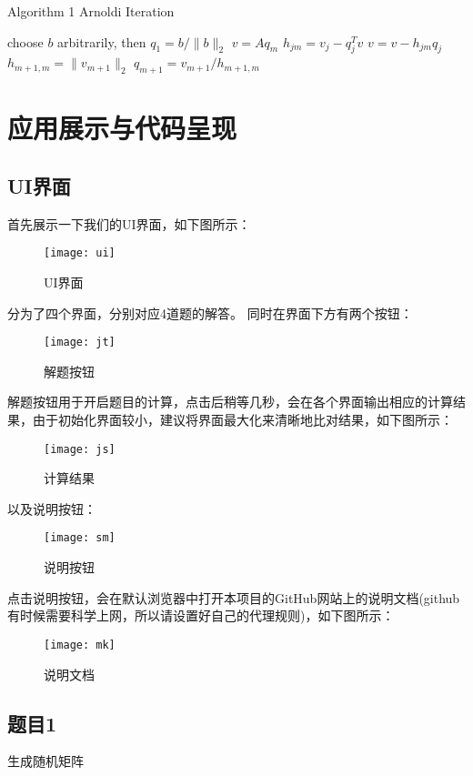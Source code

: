 \documentclass{source/Report}
\begin{document}
\begin{algorithm}
  \caption{Algorithm 1 Arnoldi Iteration}
  \begin{algorithmic}[1]
    \State choose $b$ arbitrarily, then $q_1 = b/\|b\|_2$
    \State $v=Aq_m$
    \State $h_{jm} = v_j - q_j^Tv$
    \State $v=v-h_{jm}q_j$
    \EndFor
    \State $h_{m+1,m} = \|v_{m+1}\|_2$
    \State $q_{m+1} = v_{m+1}/h_{m+1,m}$
    \EndFor
  \end{algorithmic}
\end{algorithm}




\section{应用展示与代码呈现}
\subsection{UI界面}
首先展示一下我们的UI界面，如下图所示：
\begin{figure}[H]
  \centering
  \texttt{[image: ui]}
  \caption{UI界面}
\end{figure}

分为了四个界面，分别对应4道题的解答。
同时在界面下方有两个按钮：
\begin{figure}[H]
  \centering
  \texttt{[image: jt]}
  \caption{解题按钮}
\end{figure}

解题按钮用于开启题目的计算，点击后稍等几秒，会在各个界面输出相应的计算结果，由于初始化界面较小，建议将界面最大化来清晰地比对结果，如下图所示：
\begin{figure}[H]
  \centering
  \texttt{[image: js]}
  \caption{计算结果}
\end{figure}

以及说明按钮：
\begin{figure}[H]
  \centering
  \texttt{[image: sm]}
  \caption{说明按钮}
\end{figure}

点击说明按钮，会在默认浏览器中打开本项目的GitHub网站上的说明文档(github有时候需要科学上网，所以请设置好自己的代理规则)，如下图所示：
\begin{figure}[H]
  \centering
  \texttt{[image: mk]}
  \caption{说明文档}
\end{figure}

\subsection{题目1}
生成随机矩阵
\end{document}
